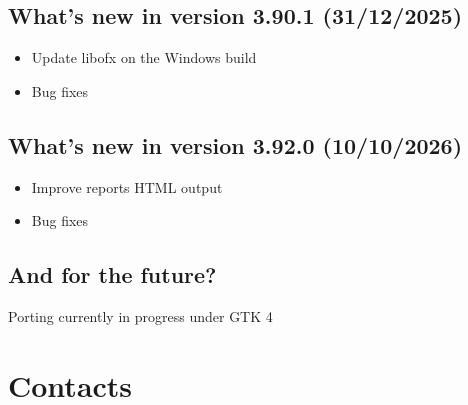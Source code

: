 \subsection{What's new in version 3.90.1 \textnormal{(31/12/2025)}}

\begin{itemize}
	\item Update libofx on the Windows build
	\item Bug fixes
\end{itemize}

\subsection{What's new in version 3.92.0 \textnormal{(10/10/2026)}}

\begin{itemize}
	\item Improve reports HTML output
	\item Bug fixes
\end{itemize}


\subsection{And for the future?}

Porting currently in progress under \gls{GTK} 4


\section{Contacts\label{introduction-contacts}}%

